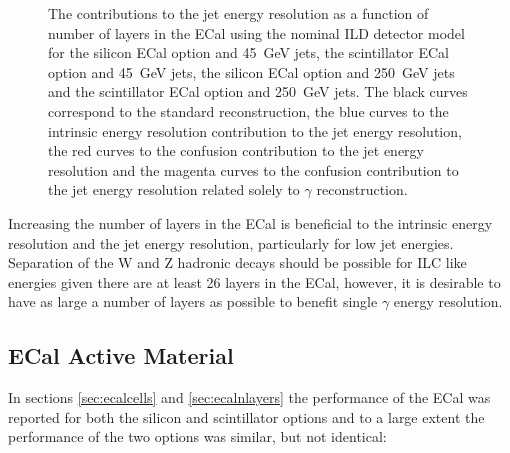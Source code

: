 \begin{figure}[h!]
\caption[The contributions to the jet energy resolution as a function of number of layers in the ECal using the nominal ILD detector model for \protect{} the silicon ECal option and 45~GeV jets, \protect{} the scintillator ECal option and 45~GeV jets, \protect{} the silicon ECal option and 250~GeV jets and \protect{} the scintillator ECal option and 250~GeV jets.  The black curves correspond to the standard reconstruction, the blue curves to the intrinsic energy resolution contribution to the jet energy resolution, the red curves to the confusion contribution to the jet energy resolution and the magenta curves to the confusion contribution to the jet energy resolution related solely to $\gamma$ reconstruction.]{The contributions to the jet energy resolution as a function of number of layers in the ECal using the nominal ILD detector model for \protect{} the silicon ECal option and 45~GeV jets, \protect{} the scintillator ECal option and 45~GeV jets, \protect{} the silicon ECal option and 250~GeV jets and \protect{} the scintillator ECal option and 250~GeV jets.  The black curves correspond to the standard reconstruction, the blue curves to the intrinsic energy resolution contribution to the jet energy resolution, the red curves to the confusion contribution to the jet energy resolution and the magenta curves to the confusion contribution to the jet energy resolution related solely to $\gamma$ reconstruction.}
\label{fig:ecalnlayersbreak}
\end{figure}

Increasing the number of layers in the ECal is beneficial to the intrinsic energy resolution and the jet energy resolution, particularly for low jet energies.  Separation of the W and Z hadronic decays should be possible for ILC like energies given there are at least 26 layers in the ECal, however, it is desirable to have as large a number of layers as possible to benefit single $\gamma$ energy resolution.  


\subsection{ECal Active Material}
In sections \ref{sec:ecalcells} and \ref{sec:ecalnlayers} the performance of the ECal was reported for both the silicon and scintillator options and to a large extent the performance of the two options was similar, but not identical:

